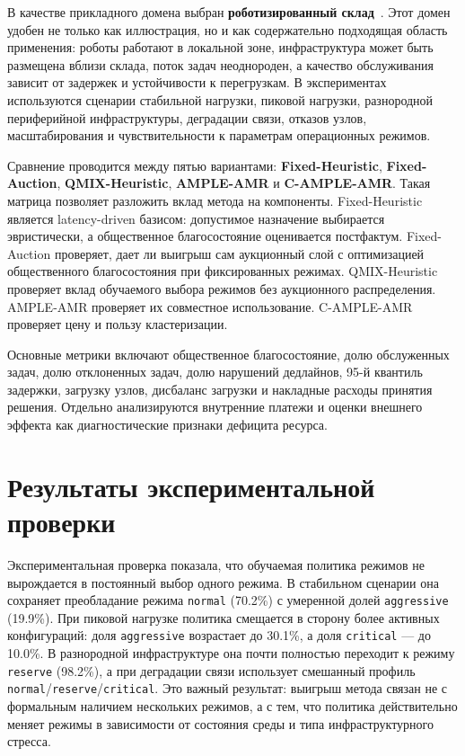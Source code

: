 \documentclass[a4paper,14pt]{extarticle}
\begin{document}
В качестве прикладного домена выбран \textbf{роботизированный склад}~\cite{Fragapane2021AMRPlanning,Fragapane2024AMRMaterialHandling,Lackner2024AMRIntralogistics,Keith2024WarehouseAMRReview}. Этот домен удобен не только как иллюстрация, но и как содержательно подходящая область применения: роботы работают в локальной зоне, инфраструктура может быть размещена вблизи склада, поток задач неоднороден, а качество обслуживания зависит от задержек и устойчивости к перегрузкам. В экспериментах используются сценарии стабильной нагрузки, пиковой нагрузки, разнородной периферийной инфраструктуры, деградации связи, отказов узлов, масштабирования и чувствительности к параметрам операционных режимов.

Сравнение проводится между пятью вариантами: \textbf{Fixed-Heuristic}, \textbf{Fixed-Auction}, \textbf{QMIX-Heuristic}, \textbf{AMPLE-AMR} и \textbf{C-AMPLE-AMR}. Такая матрица позволяет разложить вклад метода на компоненты. Fixed-Heuristic является latency-driven базисом: допустимое назначение выбирается эвристически, а общественное благосостояние оценивается постфактум. Fixed-Auction проверяет, дает ли выигрыш сам аукционный слой с оптимизацией общественного благосостояния при фиксированных режимах. QMIX-Heuristic проверяет вклад обучаемого выбора режимов без аукционного распределения. AMPLE-AMR проверяет их совместное использование. C-AMPLE-AMR проверяет цену и пользу кластеризации.

Основные метрики включают общественное благосостояние, долю обслуженных задач, долю отклоненных задач, долю нарушений дедлайнов, 95-й квантиль задержки, загрузку узлов, дисбаланс загрузки и накладные расходы принятия решения. Отдельно анализируются внутренние платежи и оценки внешнего эффекта как диагностические признаки дефицита ресурса.

\section{Результаты экспериментальной проверки}

Экспериментальная проверка показала, что обучаемая политика режимов не вырождается в постоянный выбор одного режима. В стабильном сценарии она сохраняет преобладание режима \texttt{normal} (70.2\%) с умеренной долей \texttt{aggressive} (19.9\%). При пиковой нагрузке политика смещается в сторону более активных конфигураций: доля \texttt{aggressive} возрастает до 30.1\%, а доля \texttt{critical} --- до 10.0\%. В разнородной инфраструктуре она почти полностью переходит к режиму \texttt{reserve} (98.2\%), а при деградации связи использует смешанный профиль \texttt{normal}/\texttt{reserve}/\texttt{critical}. Это важный результат: выигрыш метода связан не с формальным наличием нескольких режимов, а с тем, что политика действительно меняет режимы в зависимости от состояния среды и типа инфраструктурного стресса.
\end{document}
